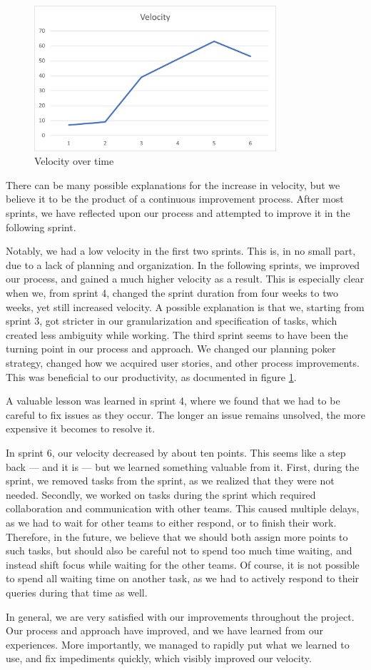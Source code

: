 \begin{figure}[h!]
\centering
\includegraphics[width=0.8\textwidth]{Images/VelocityAnalysis.png}
\caption{Velocity over time}
\label{img:velocityOverTime}
\end{figure}

There can be many possible explanations for the increase in velocity, but we believe it to be the product of a continuous improvement process.
After most sprints, we have reflected upon our process and attempted to improve it in the following sprint.

Notably, we had a low velocity in the first two sprints. This is, in no small part, due to a lack of planning and organization. In the following sprints, we improved our process, and gained a much higher velocity as a result.
This is especially clear when we, from sprint 4, changed the sprint duration from four weeks to two weeks, yet still increased velocity.
A possible explanation is that we, starting from sprint 3, got stricter in our granularization and specification of tasks, which created less ambiguity while working.
The third sprint seems to have been the turning point in our process and approach. We changed our planning poker strategy, changed how we acquired user stories, and other process improvements. This was beneficial to our productivity, as documented in figure \ref{img:velocityOverTime}.

A valuable lesson was learned in sprint 4, where we found that we had to be careful to fix issues as they occur. The longer an issue remains unsolved, the more expensive it becomes to resolve it.

In sprint 6, our velocity decreased by about ten points. This seems like a step back --- and it is --- but we learned something valuable from it.
First, during the sprint, we removed tasks from the sprint, as we realized that they were not needed. 
Secondly, we worked on tasks during the sprint which required collaboration and communication with other teams. This caused multiple delays, as we had to wait for other teams to either respond, or to finish their work. Therefore, in the future, we believe that we should both assign more points to such tasks, but should also be careful not to spend too much time waiting, and instead shift focus while waiting for the other teams. Of course, it is not possible to spend all waiting time on another task, as we had to actively respond to their queries during that time as well.

In general, we are very satisfied with our improvements throughout the project. Our process and approach have improved, and we have learned from our experiences. More importantly, we managed to rapidly put what we learned to use, and fix impediments quickly, which visibly improved our velocity.